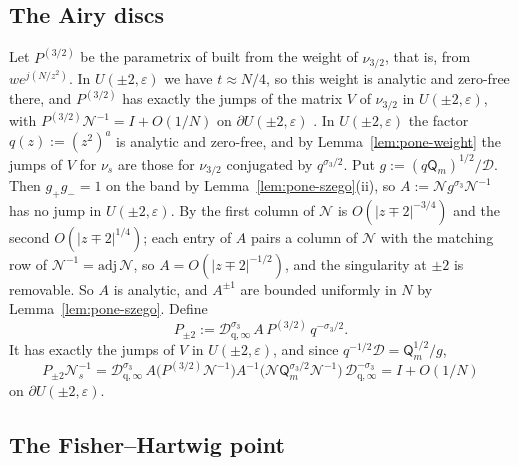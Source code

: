 \subsection{The Airy discs}\label{app:pone-airy}

Let $P^{(3/2)}$ be the parametrix of \cite[(6.10)--(6.21)]{WLXZ} built from the weight of $\nu_{3/2}$, that is, from
$we^{j(N/z^2)}$. In $U(\pm2,\varepsilon)$ we have $t\approx N/4$, so this weight is analytic and zero-free there, and
$P^{(3/2)}$ has exactly the jumps of the matrix $V$ of $\nu_{3/2}$ in $U(\pm2,\varepsilon)$, with
$P^{(3/2)}\mathcal N^{-1}=I+O(1/N)$ on $\partial U(\pm2,\varepsilon)$ \cite[(6.14)]{WLXZ}. In $U(\pm2,\varepsilon)$ the factor
$q(z):=(z^2)^a$ is analytic and zero-free, and by Lemma~\ref{lem:pone-weight} the jumps of $V$ for $\nu_s$ are those for
$\nu_{3/2}$ conjugated by $q^{\sigma_3/2}$. Put $g:=(q\mathsf Q_m)^{1/2}/\mathcal D$. Then $g_+g_-=1$ on the band by
Lemma~\ref{lem:pone-szego}(ii), so $A:=\mathcal Ng^{\sigma_3}\mathcal N^{-1}$ has no jump in $U(\pm2,\varepsilon)$. By
\cite[(5.11)]{WLXZ} the first column of $\mathcal N$ is $O(|z\mp2|^{-3/4})$ and the second $O(|z\mp2|^{1/4})$; each entry of
$A$ pairs a column of $\mathcal N$ with the matching row of $\mathcal N^{-1}=\mathrm{adj}\,\mathcal N$, so $A=O(|z\mp2|^{-1/2})$, and
the singularity at $\pm2$ is removable. So $A$ is analytic, and $A^{\pm1}$ are bounded uniformly in $N$ by
Lemma~\ref{lem:pone-szego}. Define
\[
  P_{\pm2}:=\mathcal D_{\mathrm q,\infty}^{\sigma_3}\,A\,P^{(3/2)}\,q^{-\sigma_3/2}.
\]
It has exactly the jumps of $V$ in $U(\pm2,\varepsilon)$, and since $q^{-1/2}\mathcal D=\mathsf Q_m^{1/2}/g$,
\begin{equation}\label{eq:pone-airy-match}
  P_{\pm2}\mathcal N_s^{-1}=\mathcal D_{\mathrm q,\infty}^{\sigma_3}\,A\bigl(P^{(3/2)}\mathcal N^{-1}\bigr)A^{-1}
  \bigl(\mathcal N\mathsf Q_m^{\sigma_3/2}\mathcal N^{-1}\bigr)\,\mathcal D_{\mathrm q,\infty}^{-\sigma_3}=I+O(1/N)
\end{equation}
on $\partial U(\pm2,\varepsilon)$.

\subsection{The Fisher--Hartwig point}\label{app:pone-origin}

